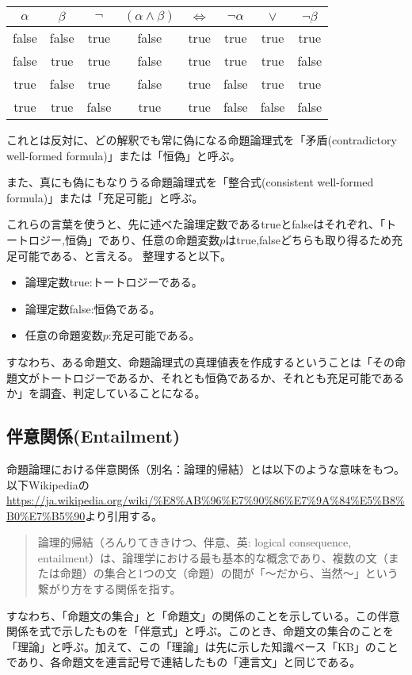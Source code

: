 \documentclass[dvipdfmx]{jsarticle}
\begin{document}
\begin{table}[H]
  \centering
\begin{tabular}{|cc||cc|c|ccc|} \hline
$\alpha$ & $\beta$ & $\neg$ & $(\alpha \wedge \beta)$ & $\Leftrightarrow$ & $\neg \alpha$ & $\vee$ & $\neg \beta$ \\ \hline
false    & false   & true   & false                   & true              & true          & true   & true         \\ \hline
false    & true    & true   & false                   & true              & true          & true   & false        \\ \hline
true     & false   & true   & false                   & true              & false         & true   & true         \\ \hline
true     & true    & false  & true                    & true              & false         & false  & false \\ \hline
\end{tabular}
\end{table}
これとは反対に、どの解釈でも常に偽になる命題論理式を「矛盾(contradictory well-formed formula)」または「恒偽」と呼ぶ。\par
また、真にも偽にもなりうる命題論理式を「整合式(consistent well-formed formula)」または「充足可能」と呼ぶ。\par
これらの言葉を使うと、先に述べた論理定数であるtrueとfalseはそれぞれ、「トートロジー,恒偽」であり、任意の命題変数$p$はtrue,falseどちらも取り得るため充足可能である、と言える。
整理すると以下。
\begin{itemize}
  \item 論理定数true:トートロジーである。
  \item 論理定数false:恒偽である。
  \item 任意の命題変数$p$:充足可能である。
\end{itemize}
すなわち、ある命題文、命題論理式の真理値表を作成するということは「その命題文がトートロジーであるか、それとも恒偽であるか、それとも充足可能であるか」を調査、判定していることになる。
\subsection{伴意関係(Entailment)}
命題論理における伴意関係（別名：論理的帰結）とは以下のような意味をもつ。以下Wikipediaの\url{https://ja.wikipedia.org/wiki/%E8%AB%96%E7%90%86%E7%9A%84%E5%B8%B0%E7%B5%90}より引用する。
\begin{quote}
  論理的帰結（ろんりてききけつ、伴意、英: logical consequence, entailment）は、論理学における最も基本的な概念であり、複数の文（または命題）の集合と1つの文（命題）の間が「～だから、当然～」という繋がり方をする関係を指す。
\end{quote}
すなわち、「命題文の集合」と「命題文」の関係のことを示している。この伴意関係を式で示したものを「伴意式」と呼ぶ。このとき、命題文の集合のことを「理論」と呼ぶ。加えて、この「理論」は先に示した知識ベース「KB」のことであり、各命題文を連言記号で連結したもの「連言文」と同じである。
\end{document}

